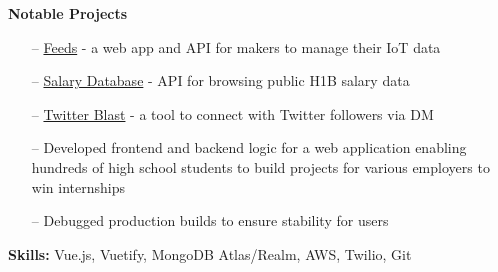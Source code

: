 \documentclass[9pt,a4paper]{altacv}
\begin{document}
\textbf{Notable Projects}\\
\begin{itemize}
    \setlength{\itemindent}{0.5em}
    \item[--] \href{https://feedzz.herokuapp.com/}{Feeds} - a web app and API for makers to manage their IoT data
    \item[--] \href{https://salary-database.herokuapp.com/}{Salary Database} - API for browsing public H1B salary data
    \item[--] \href{https://github.com/drizzleco/twitter-blast}{Twitter Blast} - a tool to connect with Twitter followers via DM
\end{itemize}

\divider


\begin{itemize}
    \setlength{\itemindent}{0.5em}
    \item[--] Developed frontend and backend logic for a web application enabling hundreds of high school students to build projects for various employers to win internships
    \item[--] Debugged production builds to ensure stability for users
\end{itemize}
\smallskip
\textbf{Skills:} Vue.js, Vuetify, MongoDB Atlas/Realm, AWS, Twilio, Git











\end{document}
